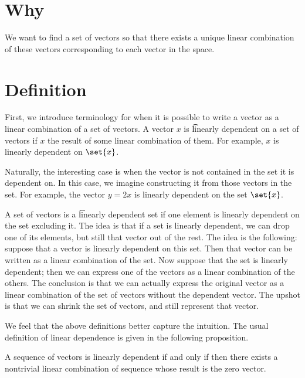 

\section*{Why}

We want to find a set of vectors so that there exists a unique linear combination of these vectors corresponding to each vector in the space.

\section*{Definition}

First, we introduce terminology for when it is possible to write a vector as a linear combination of a set of vectors.
A vector $x$ is \t{linearly dependent on a set of vectors} if $x$ the result of some linear combination of them.
For example, $x$ is linearly dependent on $\set{x}$.


Naturally, the interesting case is when the vector is not contained in the set it is dependent on.
In this case, we imagine constructing it from those vectors in the set.
For example, the vector $y = 2x$ is linearly dependent on the set $\set{x}$.

A set of vectors is a \t{linearly dependent set} if one element is linearly dependent on the set excluding it.
The idea is that if a set is linearly dependent, we can drop one of its elements, but still  that vector out of the rest.
The idea is the following: suppose that a vector is linearly dependent on this set.
Then that vector can be written as a linear combination of the set.
Now suppose that the set is linearly dependent; then we can express one of the vectors as a linear combination of the others.
The conclusion is that we can actually express the original vector as a linear combination of the set of vectors without the dependent vector.
The upshot is that we can shrink the set of vectors, and still represent that vector.

We feel that the above definitions better capture the intuition.
The usual definition of linear dependence is given in the following proposition.
\begin{proposition}
A sequence of vectors is linearly dependent if and only if then there exists a nontrivial linear combination of sequence whose result is the zero vector.\end{proposition}

